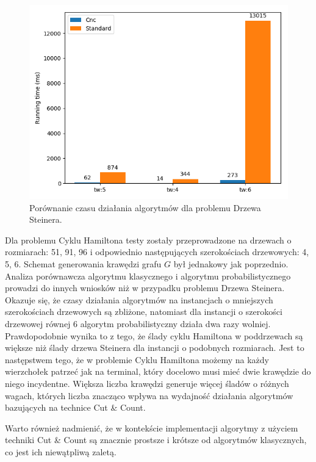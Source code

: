\documentclass[12pt, oneside]{report}
\begin{document}
\begin{figure}
\centering
\includegraphics[width=14cm]{steiner_test_time.png}
\caption{Porównanie czasu działania algorytmów dla problemu Drzewa Steinera.}
\label{steiner_test_time}
\end{figure}

Dla problemu Cyklu Hamiltona testy zostały przeprowadzone na drzewach o rozmiarach: 51, 91, 96 i odpowiednio następujących szerokościach drzewowych: 4, 5, 6. Schemat generowania krawędzi grafu $G$ był jednakowy jak poprzednio. Analiza porównawcza algorytmu klasycznego i algorytmu probabilistycznego prowadzi do innych wniosków niż w przypadku problemu Drzewa Steinera. Okazuje się, że czasy działania algorytmów na instancjach o mniejszych szerokościach drzewowych są zbliżone, natomiast dla instancji o szerokości drzewowej równej 6 algorytm probabilistyczny działa dwa razy wolniej. Prawdopodobnie wynika to z tego, że ślady cyklu Hamiltona w poddrzewach są większe niż ślady drzewa Steinera dla instancji o podobnych rozmiarach. Jest to następstwem tego, że w problemie Cyklu Hamiltona możemy na każdy wierzchołek patrzeć jak na terminal, który docelowo musi mieć dwie krawędzie do niego incydentne. Większa liczba krawędzi generuje więcej śladów o różnych wagach, których liczba znacząco wpływa na wydajność działania algorytmów bazujących na technice Cut \& Count.

Warto również nadmienić, że w kontekście implementacji algorytmy z użyciem techniki Cut \& Count są znacznie prostsze i krótsze od algorytmów klasycznych, co jest ich niewątpliwą zaletą.
\end{document}
